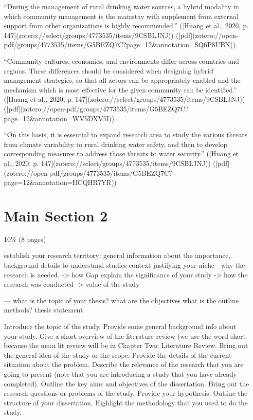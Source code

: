 “During the management of rural drinking water sources, a hybrid modality in which community management is the mainstay with supplement from external support from other organizations is highly recommended.” ([Huang et al., 2020, p. 147](zotero://select/groups/4773535/items/9CSBLJNJ)) ([pdf](zotero://open-pdf/groups/4773535/items/G5BEZQ7C?page=12&annotation=SQ6P8UBN))

“Community cultures, economies, and environments differ across countries and regions. These differences should be considered when designing hybrid management strategies, so that all actors can be appropriately enabled and the mechanism which is most effective for the given community can be identified.” ([Huang et al., 2020, p. 147](zotero://select/groups/4773535/items/9CSBLJNJ)) ([pdf](zotero://open-pdf/groups/4773535/items/G5BEZQ7C?page=12&annotation=WV5DXV5I))

“On this basis, it is essential to expand research area to study the various threats from climate variability to rural drinking water safety, and then to develop corresponding measures to address those threats to water security.” ([Huang et al., 2020, p. 147](zotero://select/groups/4773535/items/9CSBLJNJ)) ([pdf](zotero://open-pdf/groups/4773535/items/G5BEZQ7C?page=12&annotation=HCQHR7YR))

\section{Main Section 2}

10\% (8 pages)

establish your research territory: general information about the importance, background details to understand studies context
justifying your niche - why the research is needed. -> how Gap
explain the significance of your study -> how the research was conducted -> value of the study

---
what is the topic of your thesis?
what are the objectives
what is the outline
methods?
thesis statement

Introduce the topic of the study.
Provide some general background info about your study.
Give a short overview of the literature review (we use the word short because the main lit review will be in Chapter Two: Literature Review.
Bring out the general idea of the study or the scope.
Provide the details of the current situation about the problem.
Describe the relevance of the research that you are going to present (note that you are introducing a study that you have already completed).
Outline the key aims and objectives of the dissertation.
Bring out the research questions or problems of the study.
Provide your hypothesis.
Outline the structure of your dissertation.
Highlight the methodology that you used to do the study.


